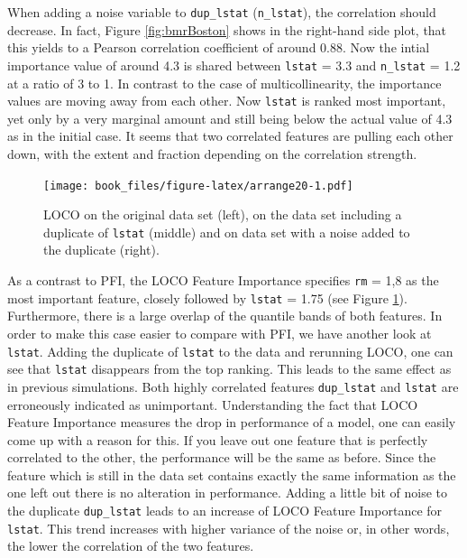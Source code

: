 \documentclass[
]{krantz}
\begin{document}
When adding a noise variable to \texttt{dup\_lstat} (\texttt{n\_lstat}), the correlation should decrease. In fact, Figure \ref{fig:bmrBoston} shows in the right-hand side plot, that this yields to a Pearson correlation coefficient of around \(0.88\). Now the intial importance value of around 4.3 is shared between \texttt{lstat} = 3.3 and \texttt{n\_lstat} = 1.2 at a ratio of 3 to 1. In contrast to the case of multicollinearity, the importance values are moving away from each other. Now \texttt{lstat} is ranked most important, yet only by a very marginal amount and still being below the actual value of 4.3 as in the initial case. It seems that two correlated features are pulling each other down, with the extent and fraction depending on the correlation strength.

\begin{figure}
\centering
\texttt{[image: book\_files/figure-latex/arrange20-1.pdf]}
\caption{\label{fig:arrange20}LOCO on the original data set (left), on the data set including a duplicate of \texttt{lstat} (middle) and on data set with a noise added to the duplicate (right).}
\end{figure}

As a contrast to PFI, the LOCO Feature Importance specifies \texttt{rm} = 1,8 as the most important feature, closely followed by \texttt{lstat} = 1.75 (see Figure \ref{fig:arrange20}). Furthermore, there is a large overlap of the quantile bands of both features. In order to make this case easier to compare with PFI, we have another look at \texttt{lstat}. Adding the duplicate of \texttt{lstat} to the data and rerunning LOCO, one can see that \texttt{lstat} disappears from the top ranking. This leads to the same effect as in previous simulations. Both highly correlated features \texttt{dup\_lstat} and \texttt{lstat} are erroneously indicated as unimportant. Understanding the fact that LOCO Feature Importance measures the drop in performance of a model, one can easily come up with a reason for this. If you leave out one feature that is perfectly correlated to the other, the performance will be the same as before. Since the feature which is still in the data set contains exactly the same information as the one left out there is no alteration in performance. Adding a little bit of noise to the duplicate \texttt{dup\_lstat} leads to an increase of LOCO Feature Importance for \texttt{lstat}. This trend increases with higher variance of the noise or, in other words, the lower the correlation of the two features.
\end{document}
